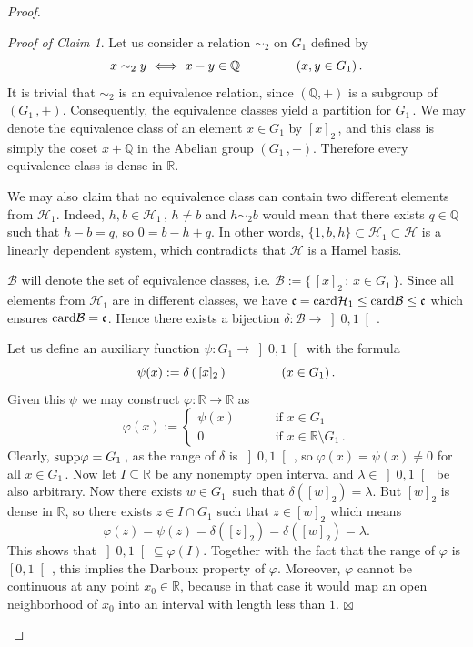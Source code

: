\documentclass[12pt]{amsart}
\theoremstyle{remark}
\newtheorem{prclm}{Proof of Claim}
\theoremstyle{definition}
\newcommand{\dlth}{\mathcal{H}}
\newcommand{\dltb}{\mathcal{B}}
\newcommand{\QQ}{\mathbb{Q}}
\newcommand{\RR}{\mathbb{R}}
\newcommand{\cnc}{\mathfrak{c}}
\newcommand{\card}{\mbox{\rm card}}
\newcommand{\supp}{\mbox{\rm supp}}
\newcommand{\map}{\longrightarrow}
\begin{document}
\begin{proof}
\begin{prclm} 
Let us consider a relation 
$ \sim_2 $ on $ G_1 $ defined by 
\[
x \sim_2 y \ \Longleftrightarrow \ x-y \in \QQ 
\hspace{15mm} \left( x,y \in G_1 \right). 
\]
It is trivial that 
$ \sim_2 $ is an equivalence relation, since 
$ \left( \QQ , + \right) $ is a subgroup of 
$ \left( G_1 \,, + \right) $. Consequently, the 
equivalence classes yield a partition for $ G_1 \,$. 
We may denote 
the equivalence class of an element 
$ x \in G_1 $ by $ [x]_2 \,$, 
and this class is simply the coset $ x + \QQ $ 
in the Abelian group $ \left( G_1 \,, + \right) $. 
Therefore every equivalence class is dense in $ \RR $. 

We may also claim that no equivalence class can contain 
two different elements from $ \dlth_1 $. Indeed, 
$ h,b \in \dlth_1 \,$, $ h \neq b $ and $ h \sim_2 b $ 
would mean that there exists 
$ q \in \QQ $ such that 
$ h-b = q $, so $ 0 = b - h + q $. 
In other words, 
$ \lbrace 1, b, h \rbrace \subset 
\dlth_1 \subset \dlth $ is a 
linearly dependent system, 
which contradicts that $ \dlth $ is a Hamel basis. 

$ \dltb $ will denote the set of 
equivalence classes, i.e. 
$ \dltb := \lbrace \, [x]_2 \, : \, x \in G_1 \, \rbrace $. 
Since all elements from $ \dlth_1 $ are 
in different classes, we have 
$ \cnc = \card \dlth_1 \leq \card \dltb \leq \cnc $ 
which ensures $ \card \dltb = \cnc $. 
Hence there exists a bijection 
$ \delta : \dltb \map \left] 0,1 \right[ \, $. 

Let us define an auxiliary function 
$ \psi : G_1 \map \left] 0,1 \right[ $ 
with the formula 
\[
\psi(x) := \delta \left( \, [x]_2 \, \right) 
\hspace{15mm} \left( x \in G_1 \right). 
\]
Given this $ \psi $ we may construct 
$ \varphi : \RR \map \RR$ as 
\[
\varphi(x) := 
\begin{cases}
\psi(x) \qquad & \mbox{ if } x \in G_1 \\ 
0 \qquad & \mbox{ if } x \in \RR \setminus G_1 \,. 
\end{cases}
\]
Clearly, $ \supp \varphi = G_1 \,$, 
as the range of $ \delta $ is $ \left] 0,1 \right[ \, $, 
so $ \varphi(x) = \psi(x) \neq 0 $ 
for all $ x \in G_1 \,$. 
Now let $ I \subseteq \RR $ be any nonempty open interval 
and $ \lambda \in \left] 0,1 \right[ \,$ be also 
arbitrary. 
Now there exists $ w \in G_1 \,$ such that 
$ \delta \left( [w]_2 \right) = \lambda $. 
But $ [w]_2 $ is dense in $ \RR $, so there exists 
$ z \in I \cap G_1 $ such that 
$ z \in [w]_2 $ which means 
\[
\varphi(z) = \psi(z) = 
\delta \left( [z]_2 \right) = 
\delta \left( [w]_2 \right) = \lambda. 
\]
This shows that 
$ \left] 0,1 \right[ \subseteq \varphi(I) $. 
Together with the fact that 
the range of $ \varphi $ is $ \left[ 0,1 \right[ \,$, 
this implies the Darboux property of $\varphi$. 
Moreover, $ \varphi $ cannot be continuous at any point 
$ x_0 \in \RR $, 
because in that case it would map an open neighborhood 
of $ x_0 $ into an interval with length less than $ 1 $. 
\hfill $ \boxtimes $   
\end{prclm}


\end{proof}
\end{document}
